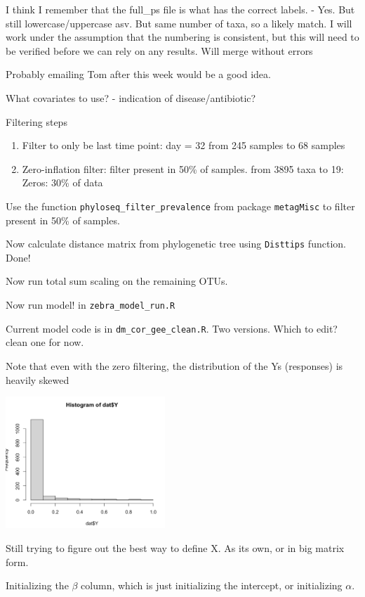 \documentclass[10pt]{article}
\begin{document}
I think I remember that the full\_ps file is what has the correct labels. - Yes. But still lowercase/uppercase asv. But same number of taxa, so a likely match. I will work under the assumption that the numbering is consistent, but this will need to be verified before we can rely on any results. Will merge without errors

Probably emailing Tom after this week would be a good idea.

What covariates to use? - indication of disease/antibiotic?

Filtering steps
\begin{enumerate}
  \item Filter to only be last time point: day = 32 from 245 samples to 68 samples
  \item Zero-inflation filter: filter present in 50\% of samples.  from 3895 taxa to 19: Zeros: 30\% of data
\end{enumerate}

Use the function \texttt{phyloseq\_filter\_prevalence} from package \texttt{metagMisc} to filter present in 50\% of samples.

Now calculate distance matrix from phylogenetic tree using \texttt{Disttips} function. Done!


Now run total sum scaling on the remaining OTUs.

Now run model! in \texttt{zebra\_model\_run.R}

Current model code is in \texttt{dm\_cor\_gee\_clean.R}. Two versions. Which to edit? clean one for now.

Note that even with the zero filtering, the distribution of the Ys (responses) is heavily skewed

\includegraphics[width=0.45\textwidth]{img/Progress_Report-ce0570ff.png}

Still trying to figure out the best way to define X. As its own, or in big matrix form.


Initializing the $\beta$ column, which is just initializing the intercept, or initializing $\alpha$.
\end{document}
